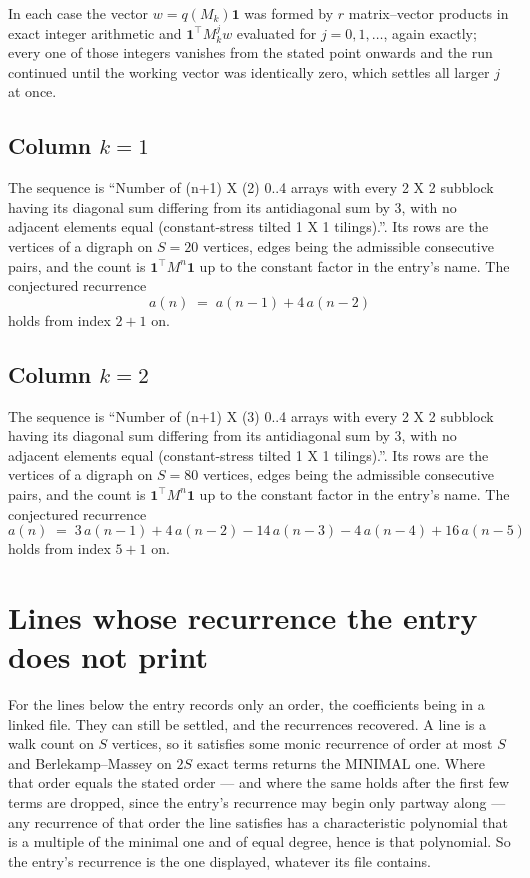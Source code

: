 \documentclass[11pt,a4paper]{article}
\theoremstyle{plain}
\theoremstyle{definition}
\begin{document}
In each case the vector $w=q(M_k)\mathbf{1}$ was formed by $r$ matrix--vector products in
exact integer arithmetic and $\mathbf{1}^{\!\top}M_k^{j}w$ evaluated for $j=0,1,\dots$,
again exactly; every one of those integers vanishes from the stated point onwards and the run
continued until the working vector was identically zero, which settles all larger $j$ at once.

\subsection*{Column $k$$=1$}
The sequence is ``Number of (n+1) X (2) 0..4 arrays with every 2 X 2 subblock having its diagonal sum differing from its antidiagonal sum by 3, with no adjacent elements equal (constant-stress tilted 1 X 1 tilings).''. Its rows are the vertices of a digraph on
$S=20$ vertices, edges being the admissible consecutive pairs, and the count is
$\mathbf{1}^{\!\top}M^{n}\mathbf{1}$ up to the constant factor in the entry's name.
The conjectured recurrence
\[
a(n)\;=\;a(n-1) + 4\,a(n-2)
\]
holds from index $2+1$ on.

\subsection*{Column $k$$=2$}
The sequence is ``Number of (n+1) X (3) 0..4 arrays with every 2 X 2 subblock having its diagonal sum differing from its antidiagonal sum by 3, with no adjacent elements equal (constant-stress tilted 1 X 1 tilings).''. Its rows are the vertices of a digraph on
$S=80$ vertices, edges being the admissible consecutive pairs, and the count is
$\mathbf{1}^{\!\top}M^{n}\mathbf{1}$ up to the constant factor in the entry's name.
The conjectured recurrence
\[
a(n)\;=\;3\,a(n-1) + 4\,a(n-2) - 14\,a(n-3) - 4\,a(n-4) + 16\,a(n-5)
\]
holds from index $5+1$ on.


\section{Lines whose recurrence the entry does not print}

For the lines below the entry records only an order, the coefficients being in a linked file.
They can still be settled, and the recurrences recovered. A line is a walk count on $S$
vertices, so it satisfies some monic recurrence of order at most $S$ and Berlekamp--Massey on
$2S$ exact terms returns the MINIMAL one. Where that order equals the stated order --- and
where the same holds after the first few terms are dropped, since the entry's recurrence may
begin only partway along --- any recurrence of that order the line satisfies has a
characteristic polynomial that is a multiple of the minimal one and of equal degree, hence is
that polynomial. So the entry's recurrence is the one displayed, whatever its file contains.
\end{document}
